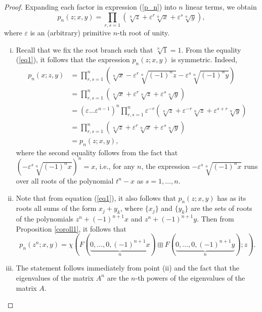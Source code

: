 \documentclass[14pt, dvipsnames]{extarticle}
\theoremstyle{definition}
\theoremstyle{definition}
\theoremstyle{remark}
\renewcommand{\epsilon}{\varepsilon}
\begin{document}
\begin{proof}
Expanding each factor in expression (\ref{p_n}) into $n$ linear terms, we obtain
\begin{equation}\label{eq1}
p_n(z; x, y) = \prod\limits_{r, s = 1}(\sqrt[n]{z} + \epsilon^r\sqrt[n]{x} + \epsilon^s\sqrt[n]{y}),
\end{equation}
where $\varepsilon$ is an (arbitrary) primitive $n$-th root of unity.

\begin{enumerate}[(i)]

\item Recall that we fix the root branch such that $\sqrt[n]{1} = 1$. From the equality (\ref{eq1}), it follows that the expression $p_n(z; x, y)$ is symmetric. Indeed,
\begin{align*}
p_n(x; z, y) &= \prod\limits_{r,s = 1}^n (\sqrt[n]{x} - \epsilon^r\sqrt[n]{(-1)^nz} - \epsilon^s\sqrt[n]{(-1)^ny}) \\
&= \prod\limits_{r,s = 1}^n (\sqrt[n]{x} + \epsilon^r\sqrt[n]{z} + \epsilon^s\sqrt[n]{y}) \\
&= \left(\epsilon \dots \epsilon^{n-1} \right)^n\prod\limits_{r, s =1}^n \epsilon^{-r}(\sqrt[n]{z} + \epsilon^{-r}\sqrt[n]{z} + \epsilon^{s+r}\sqrt[n]{y})\\
&= \prod\limits_{r,s = 1}^n (\sqrt[n]{z} + \epsilon^r\sqrt[n]{x} + \epsilon^s\sqrt[n]{y}) \\
&= p_n(z; x, y),
\end{align*}
where the second equality follows from the fact that $(-\epsilon^s\sqrt[n]{(-1)^nx})^n = x$, i.e., for any $n$, the expression $-\epsilon^s\sqrt[n]{(-1)^nx}$ runs over all roots of the polynomial $t^n - x$ as $s = 1, \dots, n$.

\item Note that from equation (\ref{eq1}), it also follows that $p_n(z; x, y)$ has as its roots all sums of the form $x_j + y_k$, where $\{x_j\}$ and $\{y_k\}$ are the sets of roots of the polynomials $z^n + (-1)^{n+1}x$ and $z^n + (-1)^{n+1}y$. Then from Proposition \ref{coroll1}, it follows that
$$p_n(z^n; x, y) =  \chi(F(\underset{n}{\underbrace{0,\dots,0,(-1)^{n+1}x}})\boxplus F(\underset{n}{\underbrace{0,\dots,0,(-1)^{n+1}y}}); z).$$

\item The statement follows immediately from point (ii) and the fact that the eigenvalues of the matrix $A^n$ are the $n$-th powers of the eigenvalues of the matrix $A$.
\end{enumerate}
\end{proof}
\end{document}
